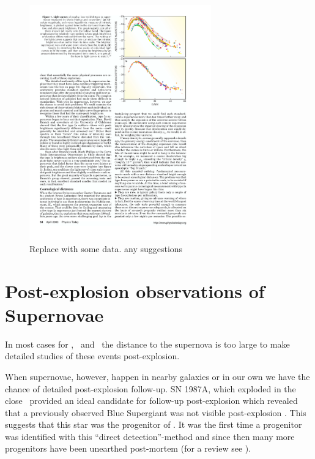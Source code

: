 \begin{figure}[htbp] %
   \centering
   \includegraphics[width=0.7\textwidth]{chapter_intro/plots/lightcurve_scaled_perlmutter2003.pdf} 
   \caption{Replace with some data. any suggestions}
   \label{fig:normalized_lightcurve}
\end{figure}

\section{Post-explosion observations of Supernovae}

In most cases for \sneia, \sneibc\ and \sneii\ the distance to the supernova is too large to make detailed studies of these events post-explosion. 

When supernovae, however, happen in nearby galaxies or in our own we have the chance of detailed post-explosion follow-up.
SN 1987A, which exploded in the close \lmc\, provided an ideal candidate for follow-up post-explosion which revealed that a previously observed Blue Supergiant was not visible post-explosion \cite{1989A&A...219..229W}. This suggests that this star was the progenitor of . It was the first time a progenitor was identified with this ``direct detection''-method and since then many more progenitors have been unearthed post-mortem (for a review see 
\cite{2009ARA&A..47...63S}).

